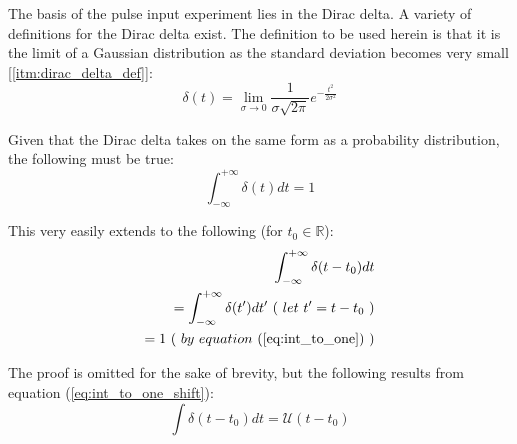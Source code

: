 The basis of the pulse input experiment lies in the Dirac delta. A variety of definitions for the Dirac delta exist. The definition to be used herein is that it is the limit of a Gaussian distribution as the standard deviation becomes very small [\ref{itm:dirac_delta_def}]:
\begin{equation}
	\label{eq:dirac_delta_def}
	\delta(t) = \lim_{\sigma \to 0} \frac{ 1 }{ \sigma \sqrt{ 2 \pi } } e^{ - \frac{ t^2 }{ 2\sigma^2 } }
\end{equation}

Given that the Dirac delta takes on the same form as a probability distribution, the following must be true:
\begin{equation}
	\label{eq:int_to_one}
	\int_{-\infty}^{+\infty}{\delta(t)dt} = 1
\end{equation}

This very easily extends to the following (for $t_0 \in \mathbb{R}$):
\begin{equation}
	\begin{aligned}
	\label{eq:int_to_one_shift}
		\int_{-\infty}^{+\infty}{\delta(t-t_0)dt} \\
		= \int_{-\infty}^{+\infty}{\delta(t')dt'} \ ( \ let \ t' = t - t_0 \ ) \\
		= 1 \ ( \ by \ equation \ (\ref{eq:int_to_one}) \ )
	\end{aligned}
\end{equation}

The proof is omitted for the sake of brevity, but the following results from equation (\ref{eq:int_to_one_shift}):
\begin{equation}
	\label{eq:int_of_dirac_is_step}
	\int \delta( t - t_0 )dt = \mathcal{U}( t - t_0 )
\end{equation}

